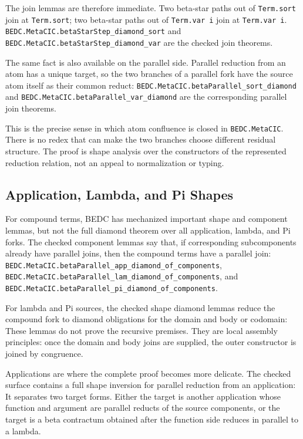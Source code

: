 The join lemmas are therefore immediate. Two beta-star paths out of
\texttt{Term.sort} join at \texttt{Term.sort}; two beta-star paths out of
\texttt{Term.var i} join at \texttt{Term.var i}.
\texttt{BEDC.MetaCIC.betaStarStep\_diamond\_sort} and
\texttt{BEDC.MetaCIC.betaStarStep\_diamond\_var} are the checked join
theorems.

The same fact is also available on the parallel side. Parallel reduction from
an atom has a unique target, so the two branches of a parallel fork have the
source atom itself as their common reduct:
\texttt{BEDC.MetaCIC.betaParallel\_sort\_diamond} and
\texttt{BEDC.MetaCIC.betaParallel\_var\_diamond} are the corresponding
parallel join theorems.

This is the precise sense in which atom confluence is closed in
\texttt{BEDC.MetaCIC}. There is no redex that can make the two branches choose
different residual structure. The proof is shape analysis over the constructors
of the represented reduction relation, not an appeal to normalization or
typing.

\subsection{Application, Lambda, and Pi Shapes}
\label{subsec:metacic-app-lam-pi-shape-diamond}

For compound terms, BEDC has mechanized important shape and component lemmas,
but not the full diamond theorem over all application, lambda, and Pi forks.
The checked component lemmas say that, if corresponding subcomponents already
have parallel joins, then the compound terms have a parallel join:
\texttt{BEDC.MetaCIC.betaParallel\_app\_diamond\_of\_components},
\texttt{BEDC.MetaCIC.betaParallel\_lam\_diamond\_of\_components}, and
\texttt{BEDC.MetaCIC.betaParallel\_pi\_diamond\_of\_components}.

For lambda and Pi sources, the checked shape diamond lemmas reduce the
compound fork to diamond obligations for the domain and body or codomain:
These lemmas do not prove the recursive premises. They are local assembly
principles: once the domain and body joins are supplied, the outer constructor
is joined by congruence.

Applications are where the complete proof becomes more delicate. The checked
surface contains a full shape inversion for parallel reduction from an
application:
It separates two target forms. Either the target is another application whose
function and argument are parallel reducts of the source components, or the
target is a beta contractum obtained after the function side reduces in
parallel to a lambda.


